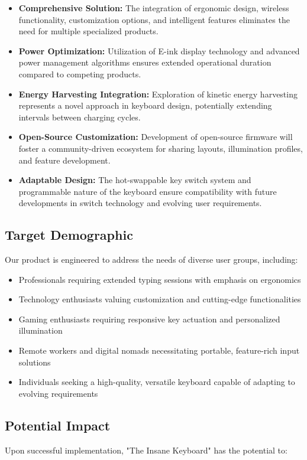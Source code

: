 \documentclass[a4paper,11pt]{article}%
\begin{document}
\begin{itemize}
    \item \textbf{Comprehensive Solution:} The integration of ergonomic design, wireless functionality, customization options, and intelligent features eliminates the need for multiple specialized products.
    \item \textbf{Power Optimization:} Utilization of E-ink display technology and advanced power management algorithms ensures extended operational duration compared to competing products.
    \item \textbf{Energy Harvesting Integration:} Exploration of kinetic energy harvesting represents a novel approach in keyboard design, potentially extending intervals between charging cycles.
    \item \textbf{Open-Source Customization:} Development of open-source firmware will foster a community-driven ecosystem for sharing layouts, illumination profiles, and feature development.
    \item \textbf{Adaptable Design:} The hot-swappable key switch system and programmable nature of the keyboard ensure compatibility with future developments in switch technology and evolving user requirements.
\end{itemize}

\subsection{Target Demographic}
Our product is engineered to address the needs of diverse user groups, including:

\begin{itemize}
    \item Professionals requiring extended typing sessions with emphasis on ergonomics
    \item Technology enthusiasts valuing customization and cutting-edge functionalities
    \item Gaming enthusiasts requiring responsive key actuation and personalized illumination
    \item Remote workers and digital nomads necessitating portable, feature-rich input solutions
    \item Individuals seeking a high-quality, versatile keyboard capable of adapting to evolving requirements
\end{itemize}

\subsection{Potential Impact}
Upon successful implementation, "The Insane Keyboard" has the potential to:
\end{document}
